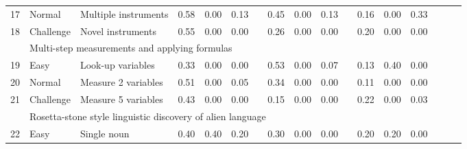 \documentclass{article}
\begin{document}
\begin{table}[!t]
\begin{tabular}{lllccc c ccc c ccc ccc}
\rowcolor[HTML]{FFFFFF} 
17  & Normal & Multiple instruments & \cellcolor[HTML]{b67dd3}0.58 & \cellcolor[HTML]{ffffff}0.00 & \cellcolor[HTML]{e4f3e4}0.13 & & \cellcolor[HTML]{c69add}0.45 & \cellcolor[HTML]{ffffff}0.00 & \cellcolor[HTML]{e4f3e4}0.13 & & \cellcolor[HTML]{ebdcf3}0.16 & \cellcolor[HTML]{ffffff}0.00 & \cellcolor[HTML]{b9e0b9}0.33 \\ 
\rowcolor[HTML]{FFFFFF} 
18  & Challenge & Novel instruments & \cellcolor[HTML]{ba84d6}0.55 & \cellcolor[HTML]{ffffff}0.00 & \cellcolor[HTML]{ffffff}0.00 & & \cellcolor[HTML]{dec5ec}0.26 & \cellcolor[HTML]{ffffff}0.00 & \cellcolor[HTML]{ffffff}0.00 & & \cellcolor[HTML]{e6d2f0}0.20 & \cellcolor[HTML]{ffffff}0.00 & \cellcolor[HTML]{ffffff}0.00 \\ \hline
\rowcolor[HTML]{F3F3F3} 
\multicolumn{2}{l}{\textbf{Rocket Science}} & \multicolumn{11}{l}{Multi-step measurements and applying formulas} &  \\ 
\rowcolor[HTML]{F3F3F3} 
19  & Easy & Look-up variables & \cellcolor[HTML]{d5b5e6}0.33 & \cellcolor[HTML]{ffffff}0.00 & \cellcolor[HTML]{ffffff}0.00 & & \cellcolor[HTML]{bc88d7}0.53 & \cellcolor[HTML]{ffffff}0.00 & \cellcolor[HTML]{f1f9f1}0.07 & & \cellcolor[HTML]{efe2f5}0.13 & \cellcolor[HTML]{a5c9e1}0.40 & \cellcolor[HTML]{ffffff}0.00 \\ 
\rowcolor[HTML]{F3F3F3} 
20  & Normal & Measure 2 variables & \cellcolor[HTML]{bf8dd9}0.51 & \cellcolor[HTML]{ffffff}0.00 & \cellcolor[HTML]{f5fbf5}0.05 & & \cellcolor[HTML]{d4b3e5}0.34 & \cellcolor[HTML]{ffffff}0.00 & \cellcolor[HTML]{ffffff}0.00 & & \cellcolor[HTML]{f1e6f7}0.11 & \cellcolor[HTML]{ffffff}0.00 & \cellcolor[HTML]{ffffff}0.00 \\ 
\rowcolor[HTML]{F3F3F3} 
21  & Challenge & Measure 5 variables & \cellcolor[HTML]{c99edf}0.43 & \cellcolor[HTML]{ffffff}0.00 & \cellcolor[HTML]{ffffff}0.00 & & \cellcolor[HTML]{ecdef4}0.15 & \cellcolor[HTML]{ffffff}0.00 & \cellcolor[HTML]{ffffff}0.00 & & \cellcolor[HTML]{e3ceef}0.22 & \cellcolor[HTML]{ffffff}0.00 & \cellcolor[HTML]{f9fcf9}0.03 \\ \hline
\rowcolor[HTML]{FFFFFF} 
\multicolumn{2}{l}{\textbf{Translation}} & \multicolumn{11}{l}{Rosetta-stone style linguistic discovery of alien language} &  \\ 
\rowcolor[HTML]{FFFFFF} 
22  & Easy & Single noun & \cellcolor[HTML]{cda5e1}0.40 & \cellcolor[HTML]{a5c9e1}0.40 & \cellcolor[HTML]{d5ecd5}0.20 & & \cellcolor[HTML]{d9bce9}0.30 & \cellcolor[HTML]{ffffff}0.00 & \cellcolor[HTML]{ffffff}0.00 & & \cellcolor[HTML]{e6d2f0}0.20 & \cellcolor[HTML]{d2e4f0}0.20 & \cellcolor[HTML]{ffffff}0.00 \\ 

\end{tabular}
\end{table}
\end{document}
